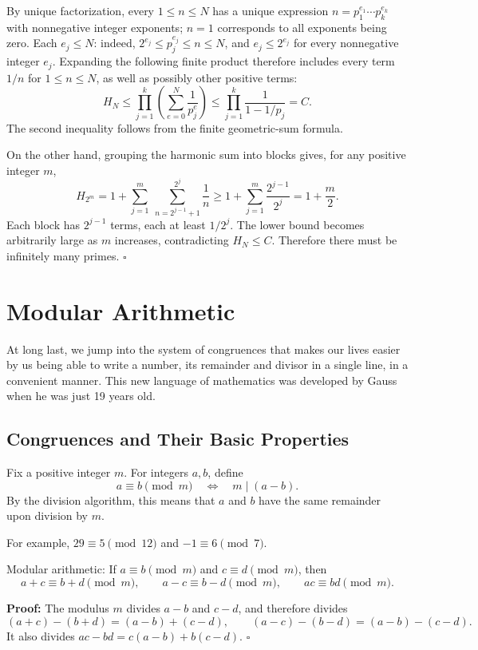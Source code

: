 \documentclass[a4paper,11pt,abstracton]{scrartcl}
\theoremstyle{dotlessP}
\theoremstyle{dotlessS}
\theoremstyle{remark}
\theoremstyle{definition}
\begin{document}
By unique factorization, every $1\leq n\leq N$ has a unique expression
$n=p_1^{e_1}\cdots p_k^{e_k}$ with nonnegative integer exponents;
$n=1$ corresponds to all exponents being zero. Each $e_j\leq N$:
indeed, $2^{e_j}\leq p_j^{e_j}\leq n\leq N$, and
$e_j\leq2^{e_j}$ for every nonnegative integer $e_j$.
Expanding the following finite product therefore includes every term
$1/n$ for $1\leq n\leq N$, as well as possibly other positive terms:
\[
    H_N\leq
    \prod_{j=1}^{k}\left(\sum_{e=0}^{N}\frac{1}{p_j^e}\right)
    \leq\prod_{j=1}^{k}\frac{1}{1-1/p_j}=C.
\]
The second inequality follows from the finite geometric-sum formula.

On the other hand, grouping the harmonic sum into blocks gives, for
any positive integer $m$,
\[
    H_{2^m}
    =1+\sum_{j=1}^{m}\ \sum_{n=2^{j-1}+1}^{2^j}\frac{1}{n}
    \geq1+\sum_{j=1}^{m}\frac{2^{j-1}}{2^j}
    =1+\frac{m}{2}.
\]
Each block has $2^{j-1}$ terms, each at least $1/2^j$.
The lower bound becomes arbitrarily large as $m$ increases, contradicting
$H_N\leq C$. Therefore there must be infinitely many primes.
\hfill$\square$


\section{Modular Arithmetic}

At long last, we jump into the system of congruences that makes our lives easier by us being able to write a number, its remainder and divisor in a single line, in a convenient manner. This new language of mathematics was developed by Gauss when he was just 19 years old. 

\subsection{Congruences and Their Basic Properties}


\begin{definition_box}
Fix a positive integer $m$. For integers $a,b$, define
\[
    a\equiv b\pmod m
    \quad\Longleftrightarrow\quad m\mid(a-b).
\]
By the division algorithm, this means that $a$ and $b$ have the same
remainder upon division by $m$.
\end{definition_box}

\begin{example_box}
For example, $29\equiv5\pmod{12}$ and
$-1\equiv6\pmod7$.
\end{example_box}


\begin{mainbox}{Modular arithmetic:}
If $a\equiv b\pmod m$ and $c\equiv d\pmod m$, then
\[
    a+c\equiv b+d\pmod m,\qquad
    a-c\equiv b-d\pmod m,\qquad
    ac\equiv bd\pmod m.
\]
\end{mainbox}
\textbf{Proof:}
The modulus $m$ divides $a-b$ and $c-d$, and therefore divides
\[
    (a+c)-(b+d)=(a-b)+(c-d),\qquad
    (a-c)-(b-d)=(a-b)-(c-d).
\]
It also divides $ac-bd=c(a-b)+b(c-d)$.
\hfill$\square$
\end{document}
